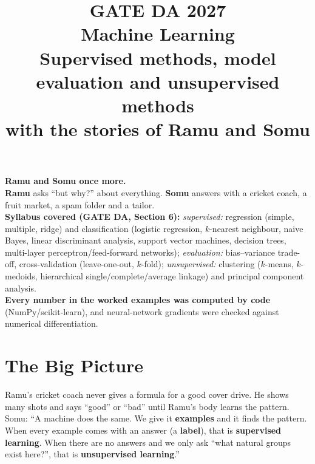 \documentclass[11pt,a4paper]{article}
\title{\Huge\bfseries GATE DA 2027\\[4pt] \Large Machine Learning\\[8pt]
\large Supervised methods, model evaluation and unsupervised methods\\
with the stories of Ramu and Somu}
\author{}
\date{}
\begin{document}
\maketitle
\thispagestyle{empty}

\begin{center}
\begin{tcolorbox}[colback=yellow!10,colframe=orange!80!black,width=0.9\textwidth,breakable]
\textbf{Ramu and Somu once more.}\\
\textbf{Ramu} asks ``but why?'' about everything. \textbf{Somu} answers with a cricket coach, a fruit market, a spam folder and a tailor.\\[4pt]
\textbf{Syllabus covered (GATE DA, Section 6):} \emph{supervised:} regression (simple, multiple, ridge) and classification (logistic regression, $k$-nearest neighbour, naive Bayes, linear discriminant analysis, support vector machines, decision trees, multi-layer perceptron/feed-forward networks); \emph{evaluation:} bias--variance trade-off, cross-validation (leave-one-out, $k$-fold); \emph{unsupervised:} clustering ($k$-means, $k$-medoids, hierarchical single/complete/average linkage) and principal component analysis.\\[4pt]
\textbf{Every number in the worked examples was computed by code} (NumPy/scikit-learn), and neural-network gradients were checked against numerical differentiation.
\end{tcolorbox}
\end{center}

\tableofcontents
\newpage

\section{The Big Picture}

\begin{story}
Ramu's cricket coach never gives a formula for a good cover drive. He shows many shots and says ``good'' or ``bad'' until Ramu's body learns the pattern. Somu: ``A machine does the same. We give it \textbf{examples} and it finds the pattern. When every example comes with an answer (a \textbf{label}), that is \textbf{supervised learning}. When there are no answers and we only ask ``what natural groups exist here?'', that is \textbf{unsupervised learning}.''
\end{story}
\end{document}
